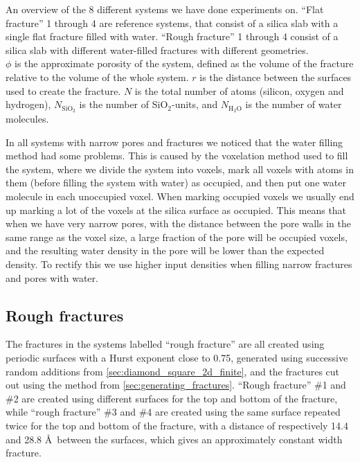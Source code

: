 \begin{table}[htpb]
{%
        An overview of the 8 different systems we have done experiments on. ``Flat fracture'' 1 through 4 are reference systems, that consist of a silica slab with a single flat fracture filled with water. ``Rough fracture'' 1 through 4 consist of a silica slab with different water-filled fractures with different geometries.%
        \\%
%
        $\phi$ is the approximate porosity of the system, defined as the volume of the fracture relative to the volume of the whole system. $r$ is the distance between the surfaces used to create the fracture. $N$ is the total number of atoms (silicon, oxygen and hydrogen), $N_\text{SiO$_2$}$ is the number of SiO$_2$-units, and $N_\text{H$_2$O}$ is the number of water molecules. %
%
        \label{tab:systems}%
    }
\end{table}%

In all systems with narrow pores and fractures we noticed that the water filling method had some problems. This is caused by the voxelation method used to fill the system, where we divide the system into voxels, mark all voxels with atoms in them (before filling the system with water) as occupied, and then put one water molecule in each unoccupied voxel. When marking occupied voxels we usually end up marking a lot of the voxels at the silica surface as occupied. This means that when we have very narrow pores, with the distance between the pore walls in the same range as the voxel size, a large fraction of the pore will be occupied voxels, and the resulting water density in the pore will be lower than the expected density. To rectify this we use higher input densities when filling narrow fractures and pores with water.


\subsection*{Rough fractures}
The fractures in the systems labelled ``rough fracture'' are all created using periodic surfaces with a Hurst exponent close to 0.75, generated using successive random additions from \cref{sec:diamond_square_2d_finite}, and the fractures cut out using the method from \cref{sec:generating_fractures}. ``Rough fracture'' \#1 and \#2 are created using different surfaces for the top and bottom of the fracture, while ``rough fracture'' \#3 and \#4 are created using the same surface repeated twice for the top and bottom of the fracture, with a distance of respectively 14.4 and 28.8 \AA\ between the surfaces, which gives an approximately constant width fracture. 

